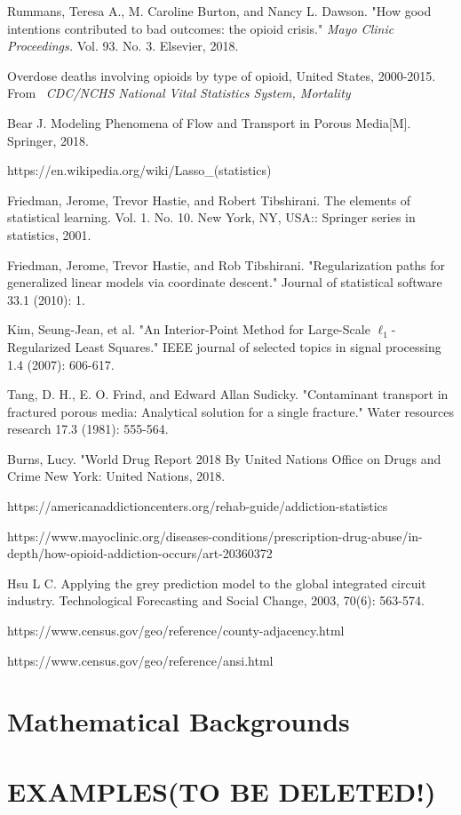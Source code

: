 \documentclass[12pt]{article} %
\begin{document}
\begin{thebibliography}{99} %

Rummans, Teresa A., M. Caroline Burton, and Nancy L. Dawson. "How good intentions contributed to bad outcomes: the opioid crisis." \textit{Mayo Clinic Proceedings.} Vol. 93. No. 3. Elsevier, 2018.

Overdose deaths involving opioids by type of opioid, United States, 2000-2015. From  \textit{CDC/NCHS National Vital Statistics System, Mortality}

Bear J. Modeling Phenomena of Flow and Transport in Porous Media[M]. Springer, 2018.

https://en.wikipedia.org/wiki/Lasso\_(statistics)

Friedman, Jerome, Trevor Hastie, and Robert Tibshirani. The elements of statistical learning. Vol. 1. No. 10. New York, NY, USA:: Springer series in statistics, 2001.

Friedman, Jerome, Trevor Hastie, and Rob Tibshirani. "Regularization paths for generalized linear models via coordinate descent." Journal of statistical software 33.1 (2010): 1.

Kim, Seung-Jean, et al. "An Interior-Point Method for Large-Scale $\ell_1 $-Regularized Least Squares." IEEE journal of selected topics in signal processing 1.4 (2007): 606-617.

Tang, D. H., E. O. Frind, and Edward Allan Sudicky. "Contaminant transport in fractured porous media: Analytical solution for a single fracture." Water resources research 17.3 (1981): 555-564.

Burns, Lucy. "World Drug Report 2018 By United Nations Office on Drugs and Crime New York: United Nations, 2018.

https://americanaddictioncenters.org/rehab-guide/addiction-statistics

https://www.mayoclinic.org/diseases-conditions/prescription-drug-abuse/in-depth/how-opioid-addiction-occurs/art-20360372

Hsu L C. Applying the grey prediction model to the global integrated circuit industry. Technological Forecasting and Social Change, 2003, 70(6): 563-574.

https://www.census.gov/geo/reference/county-adjacency.html

https://www.census.gov/geo/reference/ansi.html

\end{thebibliography}

\newpage
\appendix
\appendixpage
\section{Mathematical Backgrounds}
\newpage
\section{EXAMPLES(TO BE DELETED!)}

\end{document}
